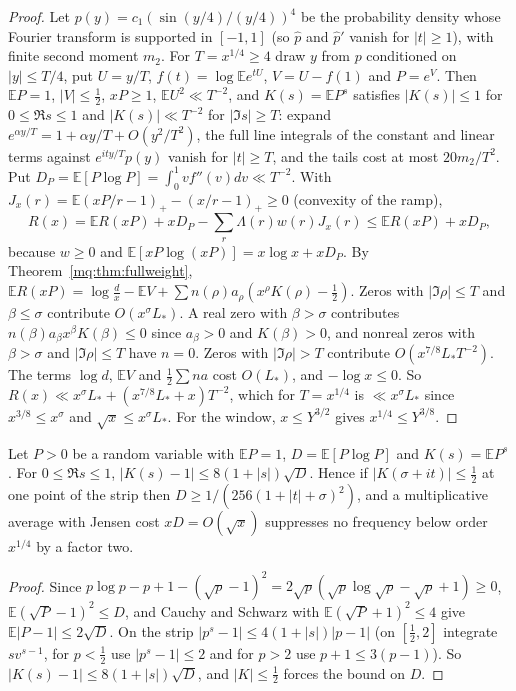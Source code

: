 \begin{proof}
Let $p(y)=c_1(\sin(y/4)/(y/4))^4$ be the probability density whose Fourier transform is supported in $[-1,1]$ (so $\hat p$ and $\hat p'$ vanish for $|t|\ge1$), with finite second moment $m_2$. For $T=x^{1/4}\ge4$ draw $y$ from $p$ conditioned on $|y|\le T/4$, put $U=y/T$, $f(t)=\log\mathbb Ee^{tU}$, $V=U-f(1)$ and $P=e^V$. Then $\mathbb EP=1$, $|V|\le\frac12$, $xP\ge1$, $\mathbb EU^2\ll T^{-2}$, and $K(s)=\mathbb EP^s$ satisfies $|K(s)|\le1$ for $0\le\Re s\le1$ and $|K(s)|\ll T^{-2}$ for $|\Im s|\ge T$: expand $e^{\alpha y/T}=1+\alpha y/T+O(y^2/T^2)$, the full line integrals of the constant and linear terms against $e^{ity/T}p(y)$ vanish for $|t|\ge T$, and the tails cost at most $20m_2/T^2$. Put $D_P=\mathbb E[P\log P]=\int_0^1vf''(v)dv\ll T^{-2}$. With $J_x(r)=\mathbb E(xP/r-1)_+-(x/r-1)_+\ge0$ (convexity of the ramp),
\[
R(x)=\mathbb ER(xP)+xD_P-\sum_r\Lambda(r)w(r)J_x(r)\le\mathbb ER(xP)+xD_P,
\]
because $w\ge0$ and $\mathbb E[xP\log(xP)]=x\log x+xD_P$. By Theorem~\ref{mq:thm:fullweight}, $\mathbb ER(xP)=\log\frac dx-\mathbb EV+\sum n(\rho)a_\rho(x^\rho K(\rho)-\frac12)$. Zeros with $|\Im\rho|\le T$ and $\beta\le\sigma$ contribute $O(x^\sigma L_*)$. A real zero with $\beta>\sigma$ contributes $n(\beta)a_\beta x^\beta K(\beta)\le0$ since $a_\beta>0$ and $K(\beta)>0$, and nonreal zeros with $\beta>\sigma$ and $|\Im\rho|\le T$ have $n=0$. Zeros with $|\Im\rho|>T$ contribute $O(x^{7/8}L_*T^{-2})$. The terms $\log d$, $\mathbb EV$ and $\frac12\sum na$ cost $O(L_*)$, and $-\log x\le0$. So $R(x)\ll x^\sigma L_*+(x^{7/8}L_*+x)T^{-2}$, which for $T=x^{1/4}$ is $\ll x^\sigma L_*$ since $x^{3/8}\le x^\sigma$ and $\sqrt x\le x^\sigma L_*$. For the window, $x\le Y^{3/2}$ gives $x^{1/4}\le Y^{3/8}$.
\end{proof}

\begin{proposition}\label{mq:prop:jensen}
Let $P>0$ be a random variable with $\mathbb EP=1$, $D=\mathbb E[P\log P]$ and $K(s)=\mathbb EP^s$. For $0\le\Re s\le1$, $|K(s)-1|\le8(1+|s|)\sqrt D$. Hence if $|K(\sigma+it)|\le\frac12$ at one point of the strip then $D\ge1/(256(1+|t|+\sigma)^2)$, and a multiplicative average with Jensen cost $xD=O(\sqrt x)$ suppresses no frequency below order $x^{1/4}$ by a factor two.
\end{proposition}

\begin{proof}
Since $p\log p-p+1-(\sqrt p-1)^2=2\sqrt p(\sqrt p\log\sqrt p-\sqrt p+1)\ge0$, $\mathbb E(\sqrt P-1)^2\le D$, and Cauchy and Schwarz with $\mathbb E(\sqrt P+1)^2\le4$ give $\mathbb E|P-1|\le2\sqrt D$. On the strip $|p^s-1|\le4(1+|s|)|p-1|$ (on $[\frac12,2]$ integrate $sv^{s-1}$, for $p<\frac12$ use $|p^s-1|\le2$ and for $p>2$ use $p+1\le3(p-1)$). So $|K(s)-1|\le8(1+|s|)\sqrt D$, and $|K|\le\frac12$ forces the bound on $D$.
\end{proof}

